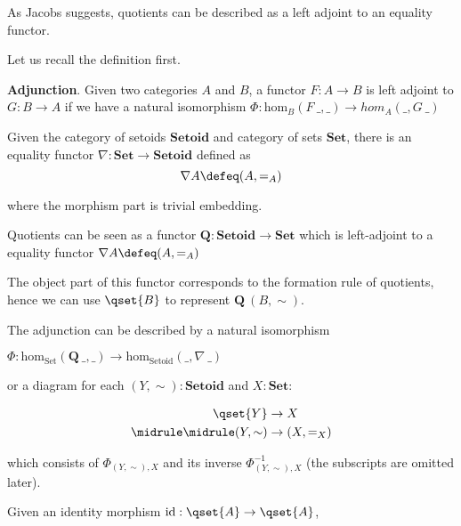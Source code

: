 As Jacobs \cite{Jacobs94quotientsin} suggests, quotients can be described as a left adjoint to an equality functor.

Let us recall the definition first.
\begin{definition}
\textbf{Adjunction}.
Given two categories $A$ and $B$, a functor $F : A \to B$ is left adjoint
to $G : B \to A$ if we have a natural isomorphism
$\Phi : \text{hom}_{B}(F ~\_ , \_) \to hom_{A}(\_, G ~\_)$
\end{definition}


Given the category of setoids $\textbf{Setoid}$ and category of sets $\textbf{Set}$, there is an equality functor $\nabla : \textbf{Set} \to \textbf{Setoid}$ defined as
$$\nabla A \defeq (A , =_{A})$$

where the morphism part is trivial embedding.

Quotients can be seen as a functor $\textbf{Q} : \textbf{Setoid} \to \textbf{Set}$ which is
left-adjoint to a equality functor $\nabla A \defeq (A , =_{A})$

The object part of this functor corresponds to the formation rule of quotients, hence we can use $\qset{B}$
to represent $\textbf{Q} ~ (B , \sim)$.

The adjunction can be described by a natural isomorphism

$\Phi : \text{hom}_{\text{Set}}(\textbf{Q}  ~\_ , \_) \to \text{hom}_{\text{Setoid}}(\_ , \nabla ~\_)$

or a diagram for each $(Y, \sim) : \textbf{Setoid}$ and $X : \textbf{Set}$:

\begin{equation*}
\begin{aligned}
\qset{Y} & \to X \\
\midrule
\midrule
(Y, \sim) & \to (X , =_{X})
\end{aligned}
\end{equation*}



which consists of $\Phi_{(Y, \sim),X}$ and its inverse $\Phi^{-1}_{(Y, \sim),X}$ (the subscripts are omitted later).


Given an identity morphism $\text{id} : \qset{A} \to \qset{A}$, 

